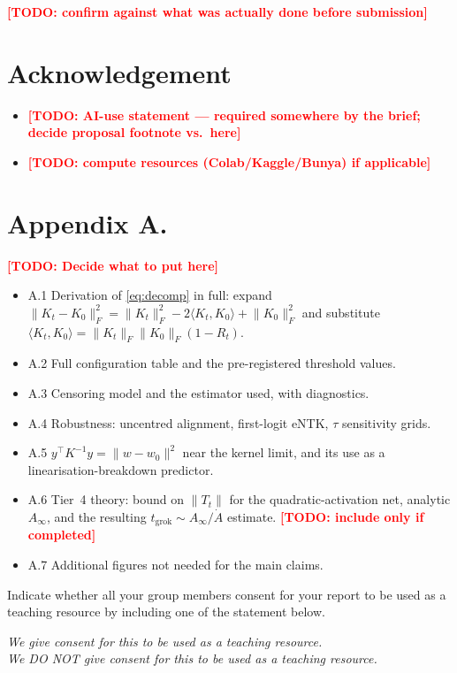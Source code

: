 \documentclass[a4paper,11pt]{article} %
\newcommand{\TODO}[1]{\textcolor{red}{\textbf{[TODO: #1]}}}
\newcommand{\Fnorm}[1]{\lVert #1 \rVert_F}
\newcommand{\tgrok}{t_{\mathrm{grok}}}
\begin{document}
\TODO{confirm against what was actually done before submission}


\section*{Acknowledgement}

\begin{itemize}
	\item \TODO{AI-use statement --- required somewhere by the brief; decide
		proposal footnote vs.\ here}
	\item \TODO{compute resources (Colab/Kaggle/Bunya) if applicable}
\end{itemize}

\section*{Appendix A.}
\label{sec:appendix}

\TODO{Decide what to put here}
\begin{itemize}
	\item A.1 Derivation of \eqref{eq:decomp} in full: expand
		$\Fnorm{K_t-K_0}^2=\Fnorm{K_t}^2-2\langle K_t,K_0\rangle+\Fnorm{K_0}^2$ and
		substitute $\langle K_t,K_0\rangle=\Fnorm{K_t}\Fnorm{K_0}(1-R_t)$.
	\item A.2 Full configuration table and the pre-registered threshold values.
	\item A.3 Censoring model and the estimator used, with diagnostics.
	\item A.4 Robustness: uncentred alignment, first-logit eNTK, $\tau$
		sensitivity grids.
	\item A.5 $y^\top K^{-1}y=\lVert w-w_0\rVert^2$ near the kernel limit, and its
		use as a linearisation-breakdown predictor.
	\item A.6 Tier~4 theory: bound on $\lVert T_t\rVert$ for the quadratic-activation
		net, analytic $A_\infty$, and the resulting $\tgrok\sim A_\infty/\dot A$
		estimate. \TODO{include only if completed}
	\item A.7 Additional figures not needed for the main claims.
\end{itemize}

\smaller
\printbibliography

\newpage
Indicate whether all your group members consent for your report to be used as a
teaching resource by including one of the statement below.

\begin{center}
\emph{We give consent for this to be used as a teaching resource.}\\
\emph{We DO NOT give consent for this to be used as a teaching resource.}
\end{center}
\end{document}
